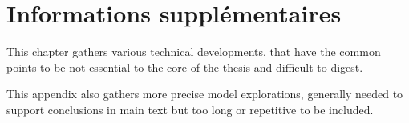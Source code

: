 


\chapter{Informations supplémentaires}

\label{app:supplementary} %






This chapter gathers various technical developments, that have the common points to be not essential to the core of the thesis and difficult to digest.


This appendix also gathers more precise model explorations, generally needed to support conclusions in main text but too long or repetitive to be included.

















